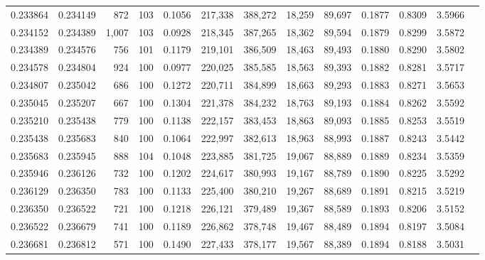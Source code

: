 \begin{tabular}{rrrrrrrrrrrrr}
0.233864 & 0.234149 &   872 & 103 &                                     0.1056 & 217,338 & 388,272 &  18,259 &  89,697 & 0.1877 & 0.8309 & 3.5966 \\
0.234152 & 0.234389 & 1,007 & 103 &                                     0.0928 & 218,345 & 387,265 &  18,362 &  89,594 & 0.1879 & 0.8299 & 3.5872 \\
0.234389 & 0.234576 &   756 & 101 &                                     0.1179 & 219,101 & 386,509 &  18,463 &  89,493 & 0.1880 & 0.8290 & 3.5802 \\
0.234578 & 0.234804 &   924 & 100 &                                     0.0977 & 220,025 & 385,585 &  18,563 &  89,393 & 0.1882 & 0.8281 & 3.5717 \\
0.234807 & 0.235042 &   686 & 100 &                                     0.1272 & 220,711 & 384,899 &  18,663 &  89,293 & 0.1883 & 0.8271 & 3.5653 \\
0.235045 & 0.235207 &   667 & 100 &                                     0.1304 & 221,378 & 384,232 &  18,763 &  89,193 & 0.1884 & 0.8262 & 3.5592 \\
0.235210 & 0.235438 &   779 & 100 &                                     0.1138 & 222,157 & 383,453 &  18,863 &  89,093 & 0.1885 & 0.8253 & 3.5519 \\
0.235438 & 0.235683 &   840 & 100 &                                     0.1064 & 222,997 & 382,613 &  18,963 &  88,993 & 0.1887 & 0.8243 & 3.5442 \\
0.235683 & 0.235945 &   888 & 104 &                                     0.1048 & 223,885 & 381,725 &  19,067 &  88,889 & 0.1889 & 0.8234 & 3.5359 \\
0.235946 & 0.236126 &   732 & 100 &                                     0.1202 & 224,617 & 380,993 &  19,167 &  88,789 & 0.1890 & 0.8225 & 3.5292 \\
0.236129 & 0.236350 &   783 & 100 &                                     0.1133 & 225,400 & 380,210 &  19,267 &  88,689 & 0.1891 & 0.8215 & 3.5219 \\
0.236350 & 0.236522 &   721 & 100 &                                     0.1218 & 226,121 & 379,489 &  19,367 &  88,589 & 0.1893 & 0.8206 & 3.5152 \\
0.236522 & 0.236679 &   741 & 100 &                                     0.1189 & 226,862 & 378,748 &  19,467 &  88,489 & 0.1894 & 0.8197 & 3.5084 \\
0.236681 & 0.236812 &   571 & 100 &                                     0.1490 & 227,433 & 378,177 &  19,567 &  88,389 & 0.1894 & 0.8188 & 3.5031 \\

\end{tabular}
